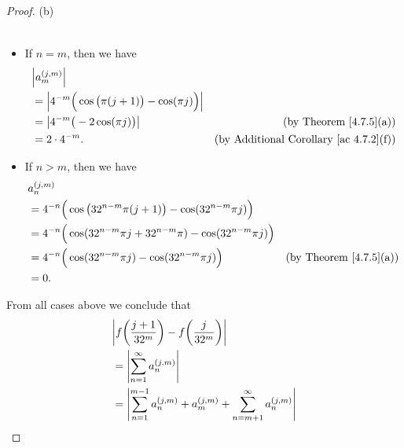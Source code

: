 \begin{proof}{(b)}
\begin{itemize}
\begin{align*}
              \end{align*}
        \item If \(n = m\), then we have
              \begin{align*}
                   & \abs*{a_m^{(j, m)}}                                                                                                    \\
                   & = \abs*{4^{-m} \Big(\cos\big(\pi (j + 1)\big) - \cos(\pi j)\Big)}                                                      \\
                   & = \abs*{4^{-m} \big(-2 \cos(\pi j)\big)}                          & \text{(by Theorem \ref{4.7.5}(a))}                 \\
                   & = 2 \cdot 4^{-m}.                                                 & \text{(by Additional Corollary \ref{ac 4.7.2}(f))}
              \end{align*}
        \item If \(n > m\), then we have
              \begin{align*}
                   & a_n^{(j, m)}                                                                                                             \\
                   & = 4^{-n} \Big(\cos\big(32^{n - m} \pi (j + 1)\big) - \cos(32^{n - m} \pi j)\Big)                                         \\
                   & = 4^{-n} \Big(\cos(32^{n - m} \pi j + 32^{n - m} \pi) - \cos(32^{n - m} \pi j)\Big)                                      \\
                   & = 4^{-n} \Big(\cos(32^{n - m} \pi j) - \cos(32^{n - m} \pi j)\Big)                  & \text{(by Theorem \ref{4.7.5}(a))} \\
                   & = 0.
              \end{align*}
    \end{itemize}
    From all cases above we conclude that
    \begin{align*}
         & \abs*{f\bigg(\frac{j + 1}{32^m}\bigg) - f\bigg(\frac{j}{32^m}\bigg)}                                                                       \\
         & = \abs*{\sum_{n = 1}^\infty a_n^{(j, m)}}                                                                                                  \\
         & = \abs*{\sum_{n = 1}^{m - 1} a_n^{(j, m)} + a_m^{(j, m)} + \sum_{n = m + 1}^\infty a_n^{(j, m)}}                                           \\

\end{align*}
\end{proof}
